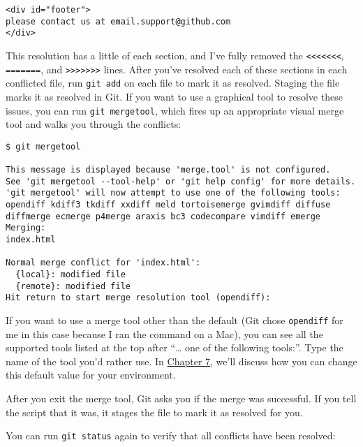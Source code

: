 \documentclass[a4paper]{book}
\newcommand{\prechap}{Chapter }
\newcommand{\postchap}{}
\newcommand{\chapref}[1]{\hyperref[chap:#1]{\prechap #1\postchap}}
\begin{document}
\begin{shaded}\begin{verbatim}
<div id="footer">
please contact us at email.support@github.com
</div>
\end{verbatim}\end{shaded}

This resolution has a little of each section, and I've fully removed the \texttt{\textless{}\textless{}\textless{}\textless{}\textless{}\textless{}\textless{}}, \texttt{=======}, and \texttt{\textgreater{}\textgreater{}\textgreater{}\textgreater{}\textgreater{}\textgreater{}\textgreater{}} lines. After you've resolved each of these sections in each conflicted file, run \texttt{git add} on each file to mark it as resolved. Staging the file marks it as resolved in Git. If you want to use a graphical tool to resolve these issues, you can run \texttt{git mergetool}, which fires up an appropriate visual merge tool and walks you through the conflicts:

\begin{shaded}\begin{verbatim}
$ git mergetool

This message is displayed because 'merge.tool' is not configured.
See 'git mergetool --tool-help' or 'git help config' for more details.
'git mergetool' will now attempt to use one of the following tools:
opendiff kdiff3 tkdiff xxdiff meld tortoisemerge gvimdiff diffuse diffmerge ecmerge p4merge araxis bc3 codecompare vimdiff emerge
Merging:
index.html

Normal merge conflict for 'index.html':
  {local}: modified file
  {remote}: modified file
Hit return to start merge resolution tool (opendiff):
\end{verbatim}\end{shaded}

If you want to use a merge tool other than the default (Git chose \texttt{opendiff} for me in this case because I ran the command on a Mac), you can see all the supported tools listed at the top after “\ldots{} one of the following tools:”. Type the name of the tool you'd rather use. In \chapref{7}, we'll discuss how you can change this default value for your environment.

After you exit the merge tool, Git asks you if the merge was successful. If you tell the script that it was, it stages the file to mark it as resolved for you.

You can run \texttt{git status} again to verify that all conflicts have been resolved:
\end{document}
